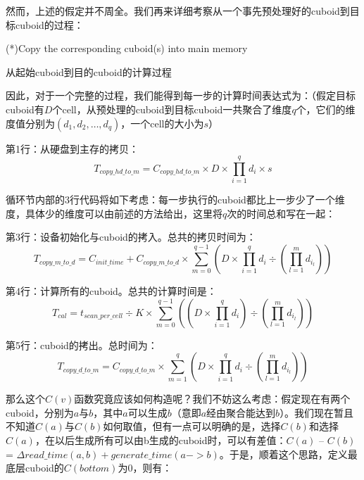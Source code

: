 然而，上述的假定并不周全。我们再来详细考察从一个事先预处理好的cuboid到目标cuboid的过程：
\begin{algorithm}[htbp]
\SetAlgoLined
{}
(*)Copy the corresponding cuboid(s) into main memory\;
\caption{从起始cuboid到目的cuboid的计算过程}
\label{algo:algorithm5}
\end{algorithm}

因此，对于一个完整的过程，我们能得到每一步的计算时间表达式为：（假定目标cuboid有$D$个cell，从预处理的cuboid到目标cuboid一共聚合了维度$q$个，它们的维度值分别为$(d_1, d_2, …, d_q)$，一个cell的大小为$s$）

第1行：从硬盘到主存的拷贝：
\begin{equation}
T_{copy\_hd\_to\_m} = C_{copy\_hd\_to\_m} \times D \times \prod_{i = 1}^{q} d_i \times s
\end{equation}

循环节内部的3行代码将如下考虑：每一步执行的cuboid都比上一步少了一个维度，具体少的维度可以由前述的方法给出，这里将$q$次的时间总和写在一起：

第3行：设备初始化与cuboid的拷入。总共的拷贝时间为：
\begin{equation}
T_{copy\_m\_to\_d} = C_{init\_time} + C_{copy\_m\_to\_d} \times \sum_{m = 0}^{q - 1} (D \times \prod_{i = 1}^{q} d_i \div (\prod_{l = 1}^{m} d_{i_l}))
\end{equation}

第4行：计算所有的cuboid。总共的计算时间是：
\begin{equation}
T_{cal} = t_{scan\_per\_cell} \div K \times \sum_{m = 0}^{q - 1} ((D \times \prod_{i = 1}^{q} d_i) \div (\prod_{l = 1}^{m} d_{i_l}))
\end{equation}

第5行：cuboid的拷出。总时间为：
\begin{equation}
T_{copy\_d\_to\_m} = C_{copy\_d\_to\_m} \times \sum_{m = 1}^{q} (D \times \prod_{i = 1}^{q} d_i \div (\prod_{l = 1}^{m} d_{i_l}))
\end{equation}

那么这个$C(v)$函数究竟应该如何构造呢？我们不妨这么考虑：假定现在有两个cuboid，分别为$a$与$b$，其中$a$可以生成$b$（意即$a$经由聚合能达到$b$）。我们现在暂且不知道$C(a)$与$C(b)$如何取值，但有一点可以明确的是，选择$C(b)$和选择$C(a)$，在以后生成所有可以由b生成的cuboid时，可以有差值：$C(a)$ – $C(b)$ = $\Delta read\_time(a, b) + generate\_time(a -> b)$。于是，顺着这个思路，定义最底层cuboid的$C(bottom)$为$0$，则有：

